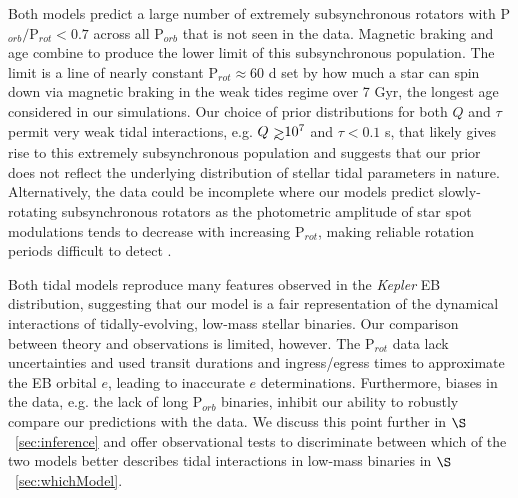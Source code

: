 \documentclass[twocolumn]{aastex61}
\def\gsim{~\rlap{$>$}{\lower 1.0ex\hbox{$\sim$}}}
\newcommand{\kepler}[0]{\textit{Kepler}\xspace}
\begin{document}
Both models predict a large number of extremely subsynchronous rotators with P$_{orb}/$P$_{rot} < 0.7$ across all P$_{orb}$ that is not seen in the \citet{Lurie2017} data. Magnetic braking and age combine to produce the lower limit of this subsynchronous population. The limit is a line of nearly constant P$_{rot} \approx 60$ d set by how much a star can spin down via magnetic braking in the weak tides regime over 7 Gyr, the longest age considered in our simulations. Our choice of prior distributions for both $Q$ and $\tau$ permit very weak tidal interactions, e.g. $Q \gsim 10^7$ and $\tau < 0.1$ s, that likely gives rise to this extremely subsynchronous population and suggests that our prior does not reflect the underlying distribution of stellar tidal parameters in nature. Alternatively, the data could be incomplete where our models predict slowly-rotating subsynchronous rotators as the photometric amplitude of star spot modulations tends to decrease with increasing P$_{rot}$, making reliable rotation periods difficult to detect \citep{McQuillan2014,Lurie2017,Reinhold2018}. 

Both tidal models reproduce many features observed in the \kepler EB distribution, suggesting that our model is a fair representation of the dynamical interactions of tidally-evolving, low-mass stellar binaries. Our comparison between theory and observations is limited, however. The \citet{Lurie2017} P$_{rot}$ data lack uncertainties and \citet{Lurie2017} used transit durations and ingress/egress times to approximate the EB orbital $e$, leading to inaccurate $e$ determinations. Furthermore, biases in the data, e.g. the lack of long P$_{orb}$ binaries, inhibit our ability to robustly compare our predictions with the data. We discuss this point further in $\S$~\ref{sec:inference} and offer observational tests to discriminate between which of the two models better describes tidal interactions in low-mass binaries in $\S$~\ref{sec:whichModel}.
\end{document}
